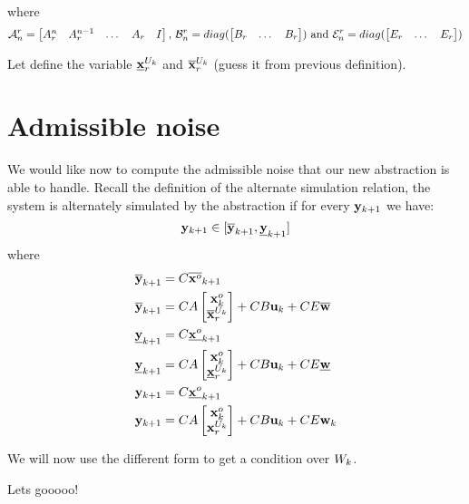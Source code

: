 \documentclass{article}
\begin{document}
where
$$
\mathcal{A}^r_n = 
\begin{bmatrix}
A_r^n & A_r^{n-1} &\dots & A_r & I
\end{bmatrix}
\textrm{, }
\mathcal{B}^r_n =
diag( 
\begin{bmatrix}
B_r &
\dots &
B_r
\end{bmatrix})
\textrm{ and }
\mathcal{E}^r_n = 
diag(\begin{bmatrix}
E_r &
\dots &
E_r
\end{bmatrix} )
$$

\newcommand{\xuki}{\minf{\x}^{U_k}_r}
\newcommand{\xuks}{\msup{\x}^{U_k}_r}
\newcommand{\xuk}{\x^{U_k}_r}
Let define the variable $\xuki$ and $\xuks$ (guess it from previous definition).

\section{Admissible noise}
We would like now to compute the admissible noise that our new abstraction is able to handle.
\newcommand{\sykn}{\msup{\y}_{k+1}}%
\newcommand{\iykn}{\minf{\y}_{k+1}}%
Recall the definition of the alternate simulation relation, the system is alternately simulated by the abstraction if for every $\mathbf{y}_{k+1}$ we have:
$$
\ykn \in [\sykn,\iykn]
$$
where 
\begin{align*}
\sykn &= C \msup{\xo}_{k+1}\\
\sykn &= C A 
\begin{bmatrix}
\xo_{k} \\
\xuks
\end{bmatrix}
+ C B \uk + C E \msup{\w}
\\
\iykn &= C \minf{\xo}_{k+1}\\
\iykn &= C A 
\begin{bmatrix}
\xo_{k} \\
\xuki
\end{bmatrix}
+ C B \uk + C E \minf{\w}
\\
\ykn &= C \minf{\xo}_{k+1}\\
\ykn &= C A 
\begin{bmatrix}
\xo_{k} \\
\xuk
\end{bmatrix}
+ C B \uk + C E \wk
\end{align*}

We will now use the different form to get a condition over $W_k$.

Lets gooooo!
\end{document}
